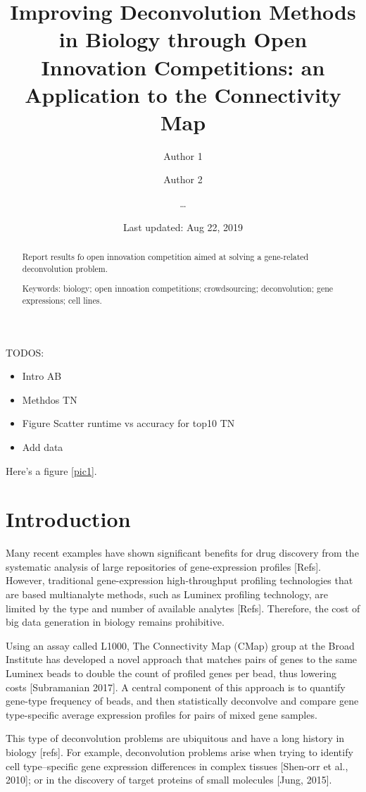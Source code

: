 \documentclass[]{article}
\title{Improving Deconvolution Methods in Biology through Open Innovation
Competitions: an Application to the Connectivity Map}
\author{Author 1 \and Author 2 \and \ldots{}}
\date{Last updated: Aug 22, 2019}
\providecommand{\tightlist}{%
  \setlength{\itemsep}{0pt}\setlength{\parskip}{0pt}}
\begin{document}
\maketitle
\begin{abstract}
Report results fo open innovation competition aimed at solving a
gene-related deconvolution problem.


\smallskip\noindent 
Keywords: biology; open innoation competitions; crowdsourcing; deconvolution; gene expressions; cell lines.
\end{abstract}

{
\setcounter{tocdepth}{2}
\newpage
\tableofcontents
\newpage
}
TODOS:

\begin{itemize}
\tightlist
\item
  Intro AB
\item
  Methdos TN
\item
  Figure Scatter runtime vs accuracy for top10 TN
\item
  Add data
\end{itemize}

Here's a figure \ref{pic1}.

\hypertarget{introduction}{%
\section{Introduction}\label{introduction}}

Many recent examples have shown significant benefits for drug discovery
from the systematic analysis of large repositories of gene-expression
profiles {[}Refs{]}. However, traditional gene-expression
high-throughput profiling technologies that are based multianalyte
methods, such as Luminex profiling technology, are limited by the type
and number of available analytes {[}Refs{]}. Therefore, the cost of big
data generation in biology remains prohibitive.

Using an assay called L1000, The Connectivity Map (CMap) group at the
Broad Institute has developed a novel approach that matches pairs of
genes to the same Luminex beads to double the count of profiled genes
per bead, thus lowering costs {[}Subramanian 2017{]}. A central
component of this approach is to quantify gene-type frequency of beads,
and then statistically deconvolve and compare gene type-specific average
expression profiles for pairs of mixed gene samples.

This type of deconvolution problems are ubiquitous and have a long
history in biology {[}refs{]}. For example, deconvolution problems arise
when trying to identify cell type--specific gene expression differences
in complex tissues {[}Shen-orr et al., 2010{]}; or in the discovery of
target proteins of small molecules {[}Jung, 2015{]}.
\end{document}
